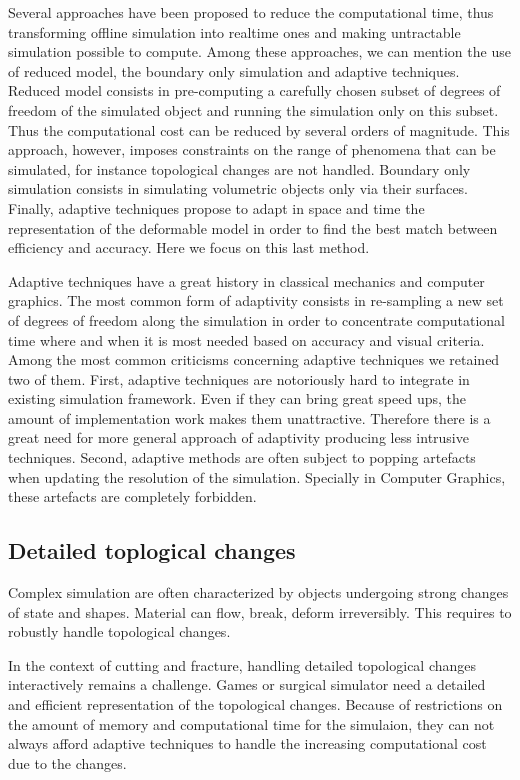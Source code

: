 Several approaches have been proposed to reduce the computational time, thus transforming offline simulation into realtime ones and making untractable simulation possible to compute. Among these approaches, we can mention the use of reduced model, the boundary only simulation and adaptive techniques. Reduced model consists in pre-computing a carefully chosen subset of degrees of freedom of the simulated object and running the simulation only on this subset. Thus the computational cost can be reduced by several orders of magnitude. This approach, however, imposes constraints on the range of phenomena that can be simulated, for instance topological changes are not handled. Boundary only simulation consists in simulating volumetric objects only via their surfaces. Finally, adaptive techniques propose to adapt in space and time the representation of the deformable model in order to find the best match between efficiency and accuracy. Here we focus on this last method.

Adaptive techniques have a great history in classical mechanics and computer graphics. The most common form of adaptivity consists in re-sampling a new set of degrees of freedom along the simulation in order to concentrate computational time where and when it is most needed based on accuracy and visual criteria. Among the most common criticisms concerning adaptive techniques we retained two of them. First, adaptive techniques are notoriously hard to integrate in existing simulation framework. Even if they can bring great speed ups, the amount of implementation work makes them unattractive. Therefore there is a great need for more general approach of adaptivity producing less intrusive techniques. Second, adaptive methods are often subject to popping artefacts when updating the resolution of the simulation. Specially in Computer Graphics, these artefacts are completely forbidden.

\subsection{Detailed toplogical changes}

Complex simulation are often characterized by objects undergoing strong changes of state and shapes. Material can flow, break, deform irreversibly. This requires to robustly handle topological changes. 

In the context of cutting and fracture, handling detailed topological changes interactively remains a challenge. Games or surgical simulator need a detailed and efficient representation of the topological changes. Because of restrictions on the amount of memory and computational time for the simulaion, they can not always afford adaptive techniques to handle the increasing computational cost due to the changes.

